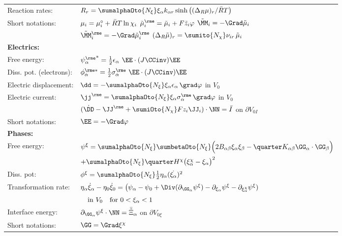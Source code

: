 \begin{table}[H]
\begin{tabular}{| l l |}
    Reaction rates: & $R_r = \sumalphaOto{\Nxi}\xia k_{\alpha r} \sinh\big((\Delta_R\mu)_r/\RT \big)$ \\
    Short notations: & $\mu_i = \mu^{\circ}_i + \bar{R}T\ln\chi_{i}$ \qquad $\muetilde_i = \tilde\mu_i + F\tilde z_i \varphi$ \qquad $\tilde\MM_i = -\Grad\tilde\mu_i$ \\
    &   $\MMetilde_i = -\Grad\muetilde_i$ \qquad $(\Delta_R\tilde\mu)_r=\sumito{\Nchi}\nuir\,\tilde\mu_i $  \\
    \hline
    \bf Electrics: & \\
    Free energy: & $\psieas = \frac{1}{2}\epsilon_{\alpha} \ \EE \cdot (J\CCinv)\EE$ \\
    Diss. pot. (electrons): & $\phies_{\alpha} = \frac{1}{2} \sigmaea \ \EE \cdot (J\CCinv)\EE$ \\
    Electric displacement: & $\dd = - \sumalphaOto{\Nxi}\xia\epsilon_\alpha \, \grad\varphi$ \quad in $V_0$\\
    Electric current: & $\jje = \sumalphaOto{\Nxi}\xia\sigmaea \, \grad\varphi$ \quad in $V_0$ \\
    & $(\dot\DD-\JJe+\sumiOto{\Nchi}Fz_i\JJ_i)\cdot\NN = \bar I$ \quad on $\partial V_{0I}$\\
    Short notations: & $\EE = -\Grad \varphi$ \\
    \hline
    \bf Phases: & \\
    Free energy: & $\psixi = \sumalphaOto{\Nxi} \sumbetaOto{\Nxi} \Big(2\Bab\xia\xib - \quarter \Kab \GGa\cdot\GGb \Big)$ \\
           & \qquad $+ \sumalphaOto{\Nxi}\quarter\Hchi\big(\xichia-\xia\big)^2$ \\
    Diss. pot: & $\phixi = \sumalphaOto{\Nxi}\frac{1}{2}\etaa\smash{(\dot\xia)}^2$ \\
    Transformation rate: & $\etaa\xiadot-\eta_0\dot\xi_0 = \big( \psi_\alpha-\psi_0 + \Div(\dGGa\psixi) - \dxia\psixi - \dxichia\psixi)$ \\ 
    & $\quad \text{in } V_0 \quad \text{for } 0<\xi_\alpha<1$\\
    Interface energy: & $\dGGa\psixi \cdot \NN = \bar{\tilde\Xi}_\alpha$ \quad on $\partial V_{0\xi}$ \\
    Short notations: & $\GG=\Grad\xichi$\\
    \hline
  \end{tabular}
  \label{tab:optCond2}
\end{table}

\newpage


